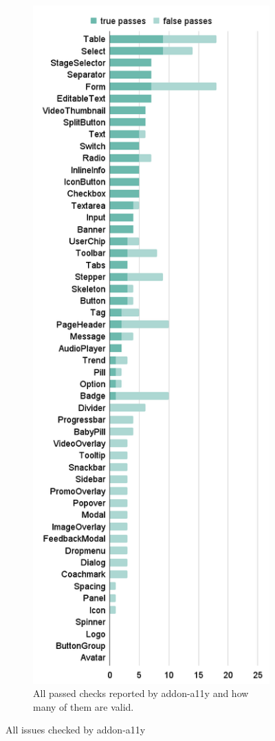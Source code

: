 \documentclass{master_thesis}
\begin{document}
\begin{figure}[ht]
\begin{subfigure}{0.45\textwidth}
	\label{fig:audit-failed}
	\end{subfigure}
	\hspace{0.05\textwidth}
	\begin{subfigure}{0.45\textwidth}
	\includegraphics[height=0.9\textheight]{img/audit-passed.png}
	\caption{All passed checks reported by addon-a11y and how many of them are valid.}
	\label{fig:audit-passed}
	\end{subfigure}
\caption{All issues checked by addon-a11y}
\label{fig:audit-passed-failed}
\end{figure}
\end{document}
